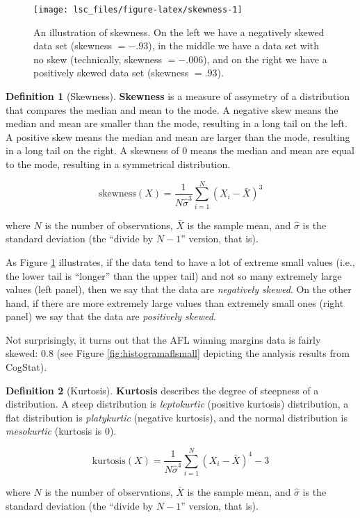 \documentclass[
]{book}
\theoremstyle{definition}
\newtheorem{definition}{Definition}[chapter]
\theoremstyle{definition}
\theoremstyle{definition}
\theoremstyle{definition}
\theoremstyle{remark}
\begin{document}
\begin{figure}

{\centering \texttt{[image: lsc\_files/figure-latex/skewness-1]} 

}

\caption[An illustration of skewness.]{An illustration of skewness. On the left we have a negatively skewed data set (skewness $= -.93$), in the middle we have a data set with no skew (technically, skewness $= -.006$), and on the right we have a positively skewed data set (skewness $= .93$).}\label{fig:skewness}
\end{figure}

\begin{definition}[Skewness]
\protect\hypertarget{def:defskewness}{}\label{def:defskewness}\textbf{Skewness} is a measure of assymetry of a distribution that compares the median and mean to the mode. A negative skew means the median and mean are smaller than the mode, resulting in a long tail on the left. A positive skew means the median and mean are larger than the mode, resulting in a long tail on the right. A skewness of 0 means the median and mean are equal to the mode, resulting in a symmetrical distribution.

\[
\mbox{skewness}(X) = \frac{1}{N \hat{\sigma}^3} \sum_{i=1}^N (X_i - \bar{X})^3
\]

where \(N\) is the number of observations, \(\bar{X}\) is the sample mean, and \(\hat{\sigma}\) is the standard deviation (the ``divide by \(N-1\)'' version, that is).
\end{definition}

As Figure \ref{fig:skewness} illustrates, if the data tend to have a lot of extreme small values (i.e., the lower tail is ``longer'' than the upper tail) and not so many extremely large values (left panel), then we say that the data are \emph{negatively skewed}. On the other hand, if there are more extremely large values than extremely small ones (right panel) we say that the data are \emph{positively skewed}.

Not surprisingly, it turns out that the AFL winning margins data is fairly skewed: \(0.8\) (see Figure \ref{fig:histogramaflsmall} depicting the analysis results from CogStat).

\begin{definition}[Kurtosis]
\protect\hypertarget{def:defkurtosis}{}\label{def:defkurtosis}\textbf{Kurtosis} describes the degree of steepness of a distribution. A steep distribution is \emph{leptokurtic} (positive kurtosis) distribution, a flat distribution is \emph{platykurtic} (negative kurtosis), and the normal distribution is \emph{mesokurtic} (kurtosis is 0).

\[
\mbox{kurtosis}(X) = \frac{1}{N \hat\sigma^4} \sum_{i=1}^N \left( X_i - \bar{X} \right)^4 - 3
\]

where \(N\) is the number of observations, \(\bar{X}\) is the sample mean, and \(\hat{\sigma}\) is the standard deviation (the ``divide by \(N-1\)'' version, that is).
\end{definition}
\end{document}
